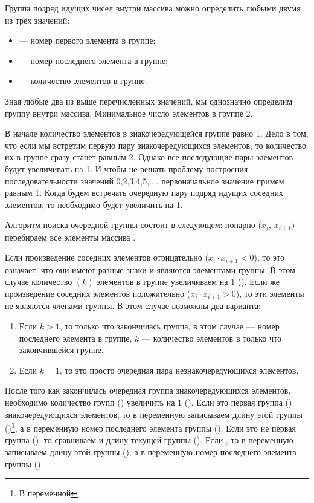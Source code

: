 Группа подряд идущих чисел внутри массива можно определить любыми двумя из трёх значений:

\begin{itemize}
\item {} --- номер первого элемента в группе;
\item {} --- номер последнего элемента в группе;
\item {} --- количество элементов в группе.
\end{itemize}
Зная любые два из выше перечисленных значений, мы однозначно определим группу внутри массива. Минимальное число
элементов в группе 2.

В начале количество элементов в знакочередующейся группе равно 1. Дело в том, что если мы встретим первую пару
знакочередующихся элементов, то количество их в группе сразу станет равным 2. Однако все последующие пары элементов
будут увеличивать  на 1. И чтобы не решать проблему построения последовательности значений
 0,2,3,4,5,..., первоначальное значение  примем равным 1. Когда будем встречать
очередную пару подряд идущих соседних элементов, то  необходимо будет увеличить на 1.

Алгоритм поиска очередной группы состоит в следующем: попарно ($x_i$, $x_{i+1})$ перебираем все элементы массива
{\small{}}. 

Если произведение соседних элементов отрицательно ($x_i\cdot x_{i+1} < 0$), то это означает, что они имеют разные знаки и
являются элементами группы. В этом случае количество $(k)$ элементов в группе увеличиваем на 1 ().
Если же произведение соседних элементов положительно ($x_i\cdot x_{i+1} > 0$), то эти элементы не являются членами
группы. В этом случае возможны два варианта:

\begin{enumerate}
\item Если  $k>1$, то только что закончилась группа, в этом случае  --- номер последнего элемента
в группе, $k$ --- количество элементов в только что закончившейся группе.
\item Если  $k=1$, то это просто очередная пара незнакочередующихся элементов.
\end{enumerate}
После того как закончилась очередная группа знакочередующихся элементов, необходимо количество групп
() увеличить на 1 (). Если это первая группа ()
знакочередующихся элементов, то в переменную  записываем длину этой группы
()\footnote{В переменной}, а в переменную
 номер последнего элемента группы
(). Если это не первая группа
(), то сравниваем  и длину текущей группы
(). Если , то в переменную 
записываем длину этой группы (), а в переменную
 номер последнего элемента группы
(). 

